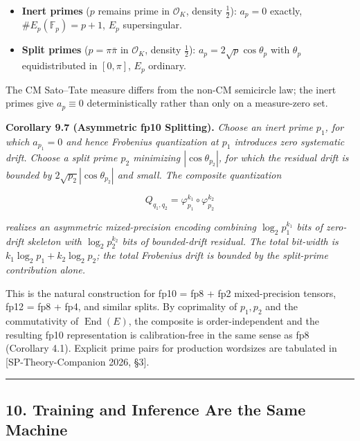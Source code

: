 \documentclass[
  11pt,
]{article}
\providecommand{\tightlist}{%
  \setlength{\itemsep}{0pt}\setlength{\parskip}{0pt}}
\begin{document}
\begin{itemize}
\tightlist
\item
  \textbf{Inert primes} (\(p\) remains prime in \(\mathcal{O}_K\),
  density \(\tfrac{1}{2}\)): \(a_p = 0\) exactly,
  \(\#E_p(\mathbb{F}_p) = p + 1\), \(E_p\) supersingular.
\item
  \textbf{Split primes} (\(p = \pi \bar{\pi}\) in \(\mathcal{O}_K\),
  density \(\tfrac{1}{2}\)): \(a_p = 2\sqrt{p}\cos\theta_p\) with
  \(\theta_p\) equidistributed in \([0, \pi]\), \(E_p\) ordinary.
\end{itemize}

The CM Sato--Tate measure differs from the non-CM semicircle law; the
inert primes give \(a_p \equiv 0\) deterministically rather than only on
a measure-zero set.

\textbf{Corollary 9.7 (Asymmetric fp10 Splitting).} \emph{Choose an
inert prime \(p_1\), for which \(a_{p_1} = 0\) and hence Frobenius
quantization at \(p_1\) introduces zero systematic drift. Choose a split
prime \(p_2\) minimizing \(|\cos\theta_{p_2}|\), for which the residual
drift is bounded by \(2\sqrt{p_2}|\cos\theta_{p_2}|\) and small. The
composite quantization}

\[Q_{q_1, q_2} = \varphi_{p_1}^{k_1} \circ \varphi_{p_2}^{k_2}\]

\emph{realizes an asymmetric mixed-precision encoding combining
\(\log_2 p_1^{k_1}\) bits of zero-drift skeleton with
\(\log_2 p_2^{k_2}\) bits of bounded-drift residual. The total bit-width
is \(k_1 \log_2 p_1 + k_2 \log_2 p_2\); the total Frobenius drift is
bounded by the split-prime contribution alone.}

This is the natural construction for fp10 = fp8 + fp2 mixed-precision
tensors, fp12 = fp8 + fp4, and similar splits. By coprimality of
\(p_1, p_2\) and the commutativity of \(\operatorname{End}(E)\), the
composite is order-independent and the resulting fp10 representation is
calibration-free in the same sense as fp8 (Corollary 4.1). Explicit
prime pairs for production wordsizes are tabulated in
{[}SP-Theory-Companion 2026, §3{]}.

\begin{center}\rule{0.5\linewidth}{0.5pt}\end{center}

\hypertarget{training-and-inference-are-the-same-machine}{%
\subsection{10. Training and Inference Are the Same
Machine}\label{training-and-inference-are-the-same-machine}}
\end{document}
